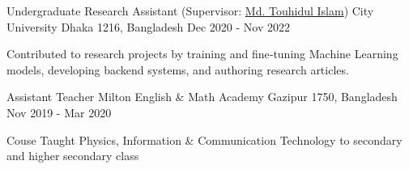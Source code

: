 \begin{cventries}
  \cventry
    {Undergraduate Research Assistant (Supervisor: \href{linkedin.com/in/touhid000/}{Md. Touhidul Islam})} %
    {City University} %
    {Dhaka 1216, Bangladesh} %
    {Dec 2020 - Nov 2022} %
    {
      \begin{cvitems} %
        \item {Contributed to research projects by training and fine‑tuning Machine Learning models, developing backend systems, and authoring research articles.}
      \end{cvitems}
    }
    
  \cventry
    {Assistant Teacher} %
    {Milton English \& Math Academy} %
    {Gazipur 1750, Bangladesh} %
    {Nov 2019 - Mar 2020} %
    {
      \begin{cvitems} %
        \item {Couse Taught Physics, Information \& Communication Technology to secondary and higher secondary class}
      \end{cvitems}
    }

\end{cventries}
